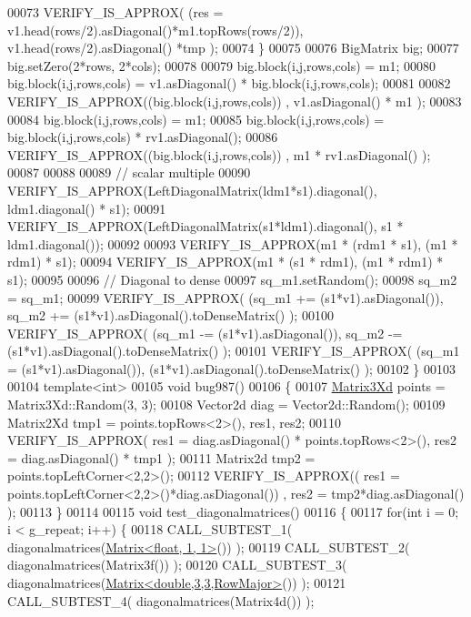\begin{DoxyCode}
00073     VERIFY\_IS\_APPROX( (res = v1.head(rows/2).asDiagonal()*m1.topRows(rows/2)), v1.head(rows/2).asDiagonal()
      *tmp );
00074   \}
00075 
00076   BigMatrix big;
00077   big.setZero(2*rows, 2*cols);
00078   
00079   big.block(i,j,rows,cols) = m1;
00080   big.block(i,j,rows,cols) = v1.asDiagonal() * big.block(i,j,rows,cols);
00081   
00082   VERIFY\_IS\_APPROX((big.block(i,j,rows,cols)) , v1.asDiagonal() * m1 );
00083   
00084   big.block(i,j,rows,cols) = m1;
00085   big.block(i,j,rows,cols) = big.block(i,j,rows,cols) * rv1.asDiagonal();
00086   VERIFY\_IS\_APPROX((big.block(i,j,rows,cols)) , m1 * rv1.asDiagonal() );
00087   
00088   
00089   \textcolor{comment}{// scalar multiple}
00090   VERIFY\_IS\_APPROX(LeftDiagonalMatrix(ldm1*s1).diagonal(), ldm1.diagonal() * s1);
00091   VERIFY\_IS\_APPROX(LeftDiagonalMatrix(s1*ldm1).diagonal(), s1 * ldm1.diagonal());
00092   
00093   VERIFY\_IS\_APPROX(m1 * (rdm1 * s1), (m1 * rdm1) * s1);
00094   VERIFY\_IS\_APPROX(m1 * (s1 * rdm1), (m1 * rdm1) * s1);
00095   
00096   \textcolor{comment}{// Diagonal to dense}
00097   sq\_m1.setRandom();
00098   sq\_m2 = sq\_m1;
00099   VERIFY\_IS\_APPROX( (sq\_m1 += (s1*v1).asDiagonal()), sq\_m2 += (s1*v1).asDiagonal().toDenseMatrix() );
00100   VERIFY\_IS\_APPROX( (sq\_m1 -= (s1*v1).asDiagonal()), sq\_m2 -= (s1*v1).asDiagonal().toDenseMatrix() );
00101   VERIFY\_IS\_APPROX( (sq\_m1 = (s1*v1).asDiagonal()), (s1*v1).asDiagonal().toDenseMatrix() );
00102 \}
00103 
00104 \textcolor{keyword}{template}<\textcolor{keywordtype}{int}>
00105 \textcolor{keywordtype}{void} bug987()
00106 \{
00107   \hyperlink{group___core___module_class_eigen_1_1_matrix}{Matrix3Xd} points = Matrix3Xd::Random(3, 3);
00108   Vector2d diag = Vector2d::Random();
00109   Matrix2Xd tmp1 = points.topRows<2>(), res1, res2;
00110   VERIFY\_IS\_APPROX( res1 = diag.asDiagonal() * points.topRows<2>(), res2 = diag.asDiagonal() * tmp1 );
00111   Matrix2d tmp2 = points.topLeftCorner<2,2>();
00112   VERIFY\_IS\_APPROX(( res1 = points.topLeftCorner<2,2>()*diag.asDiagonal()) , res2 = tmp2*diag.asDiagonal() 
      );
00113 \}
00114 
00115 \textcolor{keywordtype}{void} test\_diagonalmatrices()
00116 \{
00117   \textcolor{keywordflow}{for}(\textcolor{keywordtype}{int} i = 0; i < g\_repeat; i++) \{
00118     CALL\_SUBTEST\_1( diagonalmatrices(\hyperlink{group___core___module_class_eigen_1_1_matrix}{Matrix<float, 1, 1>}()) );
00119     CALL\_SUBTEST\_2( diagonalmatrices(Matrix3f()) );
00120     CALL\_SUBTEST\_3( diagonalmatrices(\hyperlink{group___core___module_class_eigen_1_1_matrix}{Matrix<double,3,3,RowMajor>}()) );
00121     CALL\_SUBTEST\_4( diagonalmatrices(Matrix4d()) );

\end{DoxyCode}
